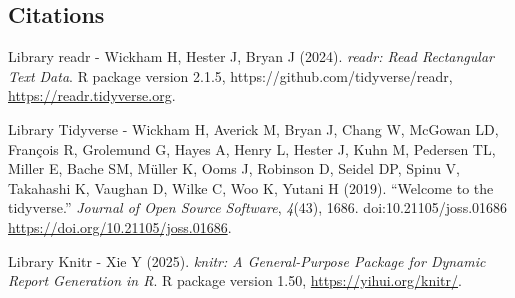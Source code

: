 \documentclass[
  letterpaper,
  DIV=11,
  numbers=noendperiod]{scrartcl}
\begin{document}
\subsection{Citations}\label{citations}

Library readr - Wickham H, Hester J, Bryan J (2024). \emph{readr: Read
Rectangular Text Data}. R package version 2.1.5,
https://github.com/tidyverse/readr, \url{https://readr.tidyverse.org}.

Library Tidyverse - Wickham H, Averick M, Bryan J, Chang W, McGowan LD,
François R, Grolemund G, Hayes A, Henry L, Hester J, Kuhn M, Pedersen
TL, Miller E, Bache SM, Müller K, Ooms J, Robinson D, Seidel DP, Spinu
V, Takahashi K, Vaughan D, Wilke C, Woo K, Yutani H (2019). ``Welcome to
the tidyverse.'' \emph{Journal of Open Source Software}, \emph{4}(43),
1686. doi:10.21105/joss.01686 \url{https://doi.org/10.21105/joss.01686}.

Library Knitr - Xie Y (2025). \emph{knitr: A General-Purpose Package for
Dynamic Report Generation in R}. R package version 1.50,
\url{https://yihui.org/knitr/}.
\end{document}
